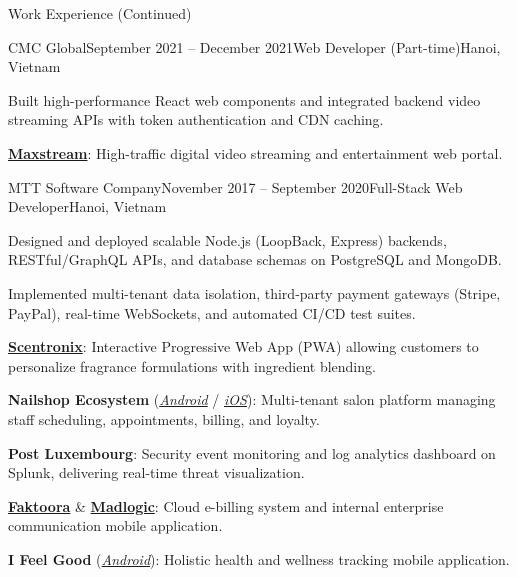\documentclass{resume}
\begin{document}
  \begin{rSection}{Work Experience (Continued)}
    \begin{rSubsection}{CMC Global}{September 2021 -- December 2021}{Web Developer (Part-time)}{Hanoi, Vietnam}
      \item Built high-performance React web components and integrated backend video streaming APIs with token authentication and CDN caching.
      \rProjectsHeader
      \item \href{https://maxstream.tv/}{\textbf{Maxstream}}: High-traffic digital video streaming and entertainment web portal.
    \end{rSubsection}

    \begin{rSubsection}{MTT Software Company}{November 2017 -- September 2020}{Full-Stack Web Developer}{Hanoi, Vietnam}
      \item Designed and deployed scalable Node.js (LoopBack, Express) backends, RESTful/GraphQL APIs, and database schemas on PostgreSQL and MongoDB.
      \item Implemented multi-tenant data isolation, third-party payment gateways (Stripe, PayPal), real-time WebSockets, and automated CI/CD test suites.
      \rProjectsHeader
      \item \href{https://app.scnt.me/}{\textbf{Scentronix}}: Interactive Progressive Web App (PWA) allowing customers to personalize fragrance formulations with ingredient blending.
      \item \textbf{Nailshop Ecosystem} (\href{https://play.google.com/store/apps/developer?id=MTT+Software+Company+LTD/}{\textit{Android}} / \href{https://apps.apple.com/us/developer/mttjsc/id1250334932}{\textit{iOS}}): Multi-tenant salon platform managing staff scheduling, appointments, billing, and loyalty.
      \item \textbf{Post Luxembourg}: Security event monitoring and log analytics dashboard on Splunk, delivering real-time threat visualization.
      \item \href{http://app.faktoora.com}{\textbf{Faktoora}} \& \href{https://www.madlogic.nl/magic/}{\textbf{Madlogic}}: Cloud e-billing system and internal enterprise communication mobile application.
      \item \textbf{I Feel Good} (\href{https://play.google.com/store/apps/details?id=com.ifg_mobile}{\textit{Android}}): Holistic health and wellness tracking mobile application.
    \end{rSubsection}


\end{rSection}
\end{document}
